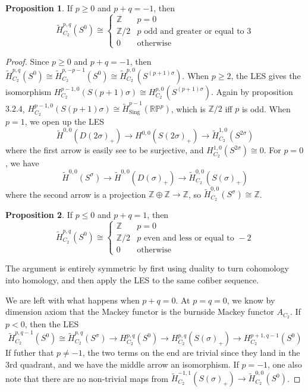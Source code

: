 \documentclass{article}
\theoremstyle{definition}
\theoremstyle{definition}
\theoremstyle{definition}
\theoremstyle{definition}
\newtheorem{proposition}{Proposition}[theorem]
\theoremstyle{definition}
\theoremstyle{definition}
\theoremstyle{definition}
\begin{document}
\begin{tcolorbox}[colback=blue!5!white,colframe=blue!30!white]
\begin{proposition}
 If $p\geq 0$ and $p+q=-1$, then 
 \[\tilde{H}^{p,q}_{C_2}(S^0)\cong \begin{cases}
    \mathbb{Z} & p=0\\
    \mathbb{Z}/2 & p \textrm{ odd and greater or equal to }3  \\
    0 & \textrm{otherwise}
 \end{cases}\]
\end{proposition}
\end{tcolorbox}
\begin{proof}
    Since $p\geq 0$ and $p+q=-1$, then $\tilde{H}^{p,q}_{C_2}(S^0)\cong \tilde{H}^{p,-p-1}_{C_2}(S^0)\cong \tilde{H}^{p,0}_{C_2}(S^{(p+1)\sigma})$. When $p\geq 2$, the LES gives the isomorphism $H_{C_2}^{p-1,0}(S(p+1)\sigma)\cong H_{C_2}^{p,0}(S^{(p+1)\sigma})$. Again by proposition $3.2.4$, $H_{C_2}^{p-1,0}(S(p+1)\sigma)\cong \tilde{H}^{p-1}_{\textrm{Sing}}(\mathbb{RP}^p)$, which is $\mathbb{Z}/2$ iff $p$ is odd. When $p=1$, we open up the LES
    \[\tilde{H}^{0,0}(D(2\sigma)_+)\to H^{0,0}(S(2\sigma)_+)\to \tilde{H}^{1,0}_{C_2}(S^{2\sigma})\]
    where the first arrow is easily see to be surjective, and $H^{1,0}_{C_2}(S^{2\sigma})\cong 0$. For $p=0$, we have 
     \[\tilde{H}^{0,0}(S^\sigma)\to \tilde{H}^{0,0}(D(\sigma)_+)\to \tilde{H}^{0,0}_{C_2}(S({\sigma})_+)\]
    where the second arrow is a projection $\mathbb{Z}\oplus \mathbb{Z}\to \mathbb{Z}$, so $\tilde{H}^{0,0}_{C_2}(S^{\sigma})\cong \mathbb{Z}$. 

    \begin{tcolorbox}[colback=blue!5!white,colframe=blue!30!white]
        \begin{proposition}
         If $p\leq 0$ and $p+q=1$, then 
         \[\tilde{H}^{p,q}_{C_2}(S^0)\cong \begin{cases}
            \mathbb{Z} & p=0\\
            \mathbb{Z}/2 & p \textrm{ even and less or equal to }-2  \\
            0 & \textrm{otherwise}
         \end{cases}\]
        \end{proposition}
        \end{tcolorbox}
The argument is entirely symmetric by first using duality to turn cohomology into homology, and then apply the LES to the same cofiber sequence. 

We are left with what happens when $p+q=0$. At $p=q=0$, we know by dimension axiom that the Mackey functor is the burnside Mackey functor $A_{C_2}$. If $p<0$, then the LES 
\[\tilde{H}_{C_2}^{p,q-1}(S^0)\cong \tilde{H}_{C_2}^{p,q}(S^{\sigma})\to H_{C_2}^{p,q}(S^0)\to H_{C_2}^{p,q}(S(\sigma)_+)\to H_{C_2}^{p+1,q-1}(S^0) \]
If futher that $p\neq -1$, the two terms on the end are trivial since they land in the 3rd quadrant, and we have the middle arrow an isomorphism. If $p=-1$, one also note that there are no non-trivial maps from $\tilde{H}_{C_2}^{-1,1}(S(\sigma)_+)\to \tilde{H}_{C_2}^{0,0}(S^0)$. 
\end{proof} 
\end{document}
